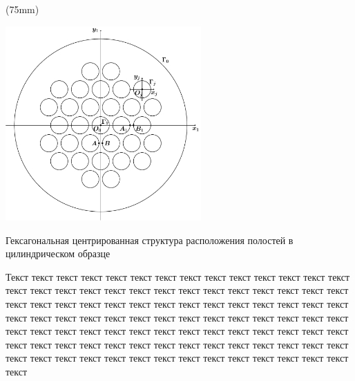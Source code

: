 \sidefig*(75mm){
\includegraphics[width=7.5cm]{hexagonal-centroid.pdf}
\caption{Гексагональная центрированная структура расположения полостей в цилиндрическом образце}
\label{f:7:24}
}{Текст текст текст текст текст текст текст текст текст текст текст текст текст текст текст текст текст текст текст текст текст текст текст текст текст текст текст текст текст текст текст текст текст текст текст текст текст текст текст текст текст текст текст текст текст текст текст текст текст текст текст текст текст текст текст текст текст текст текст текст текст текст текст текст текст текст текст текст текст текст текст текст текст текст текст текст текст текст текст текст текст текст текст текст текст текст текст текст текст текст текст текст текст текст текст текст текст текст текст}

